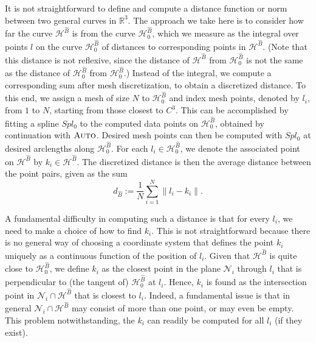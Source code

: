 \documentclass{ws-ijbc}
\begin{document}
It is not straightforward to define and compute a distance function or norm between two general curves in $\mathbb{R}^3$. The approach we take here is to consider how far the curve $\mathscr{H}^{\widehat{B}}$ is from the curve $\mathscr{H}_0^{\widehat{B}}$, which we measure as the integral over points $l$ on the curve $\mathscr{H}_0^{\widehat{B}}$ of distances to corresponding points in $\mathscr{H}^{\widehat{B}}$. (Note that this distance is not reflexive, since the distance of $\mathscr{H}^{\widehat{B}}$ from $\mathscr{H}_0^{\widehat{B}}$ is not the same as the distance of $\mathscr{H}_0^{\widehat{B}}$ from $\mathscr{H}_0^{\widehat{B}}$.) Instead of the integral, we compute a corresponding sum after mesh discretization, to obtain a discretized distance.  To this end, we assign a mesh of size $N$ to $\mathscr{H}_0^{\widehat{B}}$ and index mesh points, denoted by $l_i$, from $1$ to $N$, starting from those closest to $C^3$.  This can be accomplished by fitting a spline $Spl_0$ to the computed data points on $\mathscr{H}_0^{\widehat{B}}$, obtained by continuation with $\textsc{Auto}$.  Desired mesh points can then be computed with $Spl_0$ at desired arclengths along $\mathscr{H}_0^{\widehat{B}}$.  For each $l_i \in \mathscr{H}_0^{\widehat{B}}$, we denote the associated point on $\mathscr{H}^{\widehat{B}}$ by $k_i \in \mathscr{H}^{\widehat{B}}$.  The discretized distance is then the average distance between the point pairs, given as the sum
%
\begin{equation*}
	d_{\widehat{B}} := \frac{1}{N} \sum_{i=1}^{N} \left \lVert l_i - k_i\right \lVert.
	\label{integral_norm}
\end{equation*}
%

A fundamental difficulty in computing such a distance is that for every $l_i$, we need to make a choice of how to find $k_i$.  This is not straightforward because there is no general way of choosing a coordinate system that defines the point $k_i$  uniquely as a continuous function of the position of $l_i$. Given that  $\mathscr{H}^{\widehat{B}}$ is quite close to $\mathscr{H}_0^{\widehat{B}}$, we define $k_i$ as the closest point in the plane  $\mathscr{N}_i$ through $l_i$ that is perpendicular to (the tangent of) $\mathscr{H}^{\widehat{B}}_0$ at $l_i$. Hence, $k_i$ is found as the intersection point in $\mathscr{N}_i \cap \mathscr{H}^{\widehat{B}}$ that is closest to $l_i$. Indeed, a fundamental issue is that in general $\mathscr{N}_i \cap \mathscr{H}^{\widehat{B}}$ may consist of more than one point, or may even be empty. This problem notwithstanding, the $k_i$ can readily be computed for all $l_i$ (if they exist).  
\end{document}
